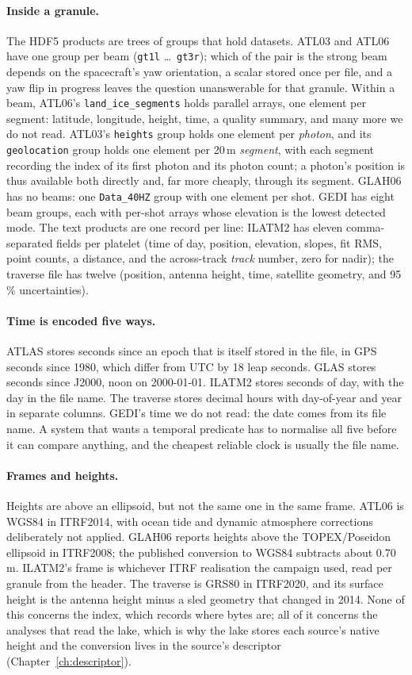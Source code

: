 \documentclass[10pt,a4paper]{article}
\newcommand{\code}[1]{\texttt{#1}}
\begin{document}
\paragraph{Inside a granule.} The HDF5 products are trees of groups that hold datasets. ATL03 and ATL06 have one
group per beam (\code{gt1l} \ldots\ \code{gt3r}); which of the pair is the strong beam depends on the spacecraft's
yaw orientation, a scalar stored once per file, and a yaw flip in progress leaves the question unanswerable for
that granule. Within a beam, ATL06's \code{land\_ice\_segments} holds parallel arrays, one element per segment:
latitude, longitude, height, time, a quality summary, and many more we do not read. ATL03's \code{heights} group
holds one element per \emph{photon}, and its \code{geolocation} group holds one element per 20\,m
\emph{segment}, with each segment recording the index of its first photon and its photon count; a photon's
position is thus available both directly and, far more cheaply, through its segment. GLAH06 has no beams: one
\code{Data\_40HZ} group with one element per shot. GEDI has eight beam groups, each with per-shot arrays whose
elevation is the lowest detected mode. The text products are one record per line: ILATM2 has eleven
comma-separated fields per platelet (time of day, position, elevation, slopes, fit RMS, point counts, a distance,
and the across-track \emph{track} number, zero for nadir); the traverse file has twelve (position, antenna height,
time, satellite geometry, and 95\,\% uncertainties).

\paragraph{Time is encoded five ways.} ATLAS stores seconds since an epoch that is itself stored in the file, in GPS
seconds since 1980, which differ from UTC by 18 leap seconds. GLAS stores seconds since J2000, noon on
2000-01-01. ILATM2 stores seconds of day, with the day in the file name. The traverse stores decimal hours with
day-of-year and year in separate columns. GEDI's time we do not read: the date comes from its file name. A system
that wants a temporal predicate has to normalise all five before it can compare anything, and the cheapest reliable
clock is usually the file name.

\paragraph{Frames and heights.} Heights are above an ellipsoid, but not the same one in the same frame. ATL06 is
WGS84 in ITRF2014, with ocean tide and dynamic atmosphere corrections deliberately not applied. GLAH06 reports
heights above the TOPEX/Poseidon ellipsoid in ITRF2008; the published conversion to WGS84 subtracts about 0.70\,m.
ILATM2's frame is whichever ITRF realisation the campaign used, read per granule from the header. The traverse is
GRS80 in ITRF2020, and its surface height is the antenna height minus a sled geometry that changed in 2014. None of
this concerns the index, which records where bytes are; all of it concerns the analyses that read the lake, which is
why the lake stores each source's native height and the conversion lives in the source's descriptor
(Chapter~\ref{ch:descriptor}).
\end{document}
